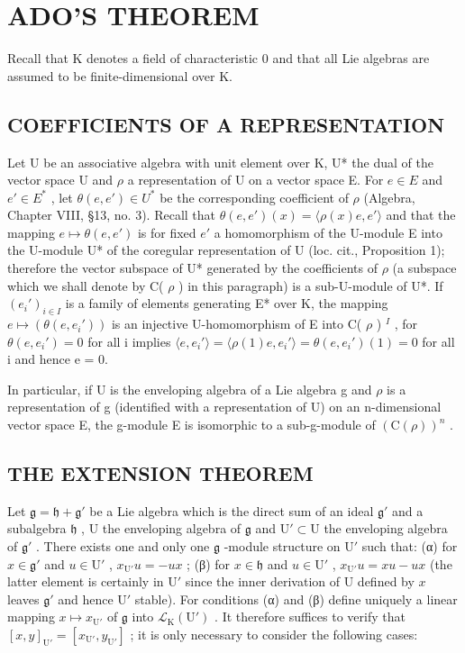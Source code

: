 \section{ADO'S THEOREM}

Recall that K denotes a field of characteristic 0 and that all Lie algebras are assumed to be finite-dimensional over K.

\subsection{COEFFICIENTS OF A REPRESENTATION}

Let U be an associative algebra with unit element over K, U* the dual of the vector space U and \(\rho\) a representation of U on a vector space E. For \(e \in E\) and \(e' \in E^*\) , let \(\theta(e, e') \in U^*\) be the corresponding coefficient of \(\rho\) (Algebra, Chapter VIII, §13, no. 3). Recall that \(\theta(e, e')(x) = \langle \rho(x)e, e' \rangle\) and that the mapping \(e \mapsto \theta(e, e')\) is for fixed \(e'\) a homomorphism of the U-module E into the U-module U* of the coregular representation of U (loc. cit., Proposition 1); therefore the vector subspace of U* generated by the coefficients of \(\rho\) (a subspace which we shall denote by C( \(\rho\) ) in this paragraph) is a sub-U-module of U*. If \((e_i')_{i \in I}\) is a family of elements generating E* over K, the mapping \(e \mapsto (\theta(e, e_i'))\) is an injective U-homomorphism of E into C( \(\rho\) ) \(^{I}\) , for \(\theta(e, e_i') = 0\) for all i implies \(\langle e, e_i' \rangle = \langle \rho(1)e, e_i' \rangle = \theta(e, e_i')(1) = 0\) for all i and hence e = 0.

In particular, if U is the enveloping algebra of a Lie algebra g and \(\rho\) is a representation of g (identified with a representation of U) on an n-dimensional vector space E, the g-module E is isomorphic to a sub-g-module of \((\mathrm{C}(\rho))^{n}\) .

\subsection{THE EXTENSION THEOREM}

Let \(\mathfrak{g} = \mathfrak{h} + \mathfrak{g}'\) be a Lie algebra which is the direct sum of an ideal \(\mathfrak{g}'\) and a subalgebra \(\mathfrak{h}\) , U the enveloping algebra of \(\mathfrak{g}\) and \(\mathrm{U}' \subset \mathrm{U}\) the enveloping algebra of \(\mathfrak{g}'\) . There exists one and only one \(\mathfrak{g}\) -module structure on \(\mathrm{U}'\) such that: (α) for \(x \in \mathfrak{g}'\) and \(u \in \mathrm{U}'\) , \(x_{\mathrm{U}'}u = -ux\) ; (β) for \(x \in \mathfrak{h}\) and \(u \in \mathrm{U}'\) , \(x_{\mathrm{U}'}u = xu - ux\) (the latter element is certainly in \(\mathrm{U}'\) since the inner derivation of U defined by \(x\) leaves \(\mathfrak{g}'\) and hence \(\mathrm{U}'\) stable). For conditions (α) and (β) define uniquely a linear mapping \(x \mapsto x_{\mathrm{U}'}\) of \(\mathfrak{g}\) into \(\mathcal{L}_{\mathrm{K}}(\mathrm{U}')\) . It therefore suffices to verify that \([x, y]_{\mathrm{U}'} = [x_{\mathrm{U}'}, y_{\mathrm{U}'}]\) ; it is only necessary to consider the following cases:


